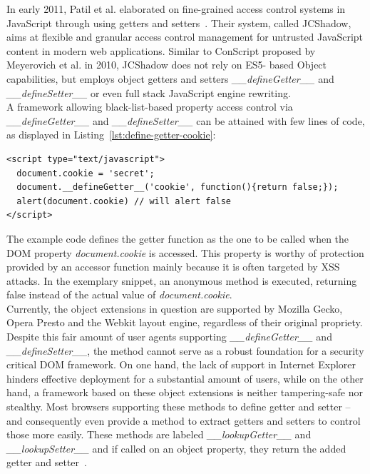       In early 2011, Patil et al. elaborated on fine-grained access control systems in JavaScript through using getters and setters~\cite{patil2011towards}. Their system, called JCShadow, aims at flexible and granular access control management for untrusted JavaScript content in modern web applications. Similar to ConScript proposed by Meyerovich et al. in 2010, JCShadow does not rely on ES5- based Object capabilities, but employs object getters and setters \textit{\_\_defineGetter\_\_} and \textit{\_\_defineSetter\_\_} or even full stack JavaScript engine rewriting. \\

      A framework allowing black-list-based property access control via \textit{\_\_defineGetter\_\_} and \textit{\_\_defineSetter\_\_} can be attained with few lines of code, as displayed in Listing~\ref{lst:define-getter-cookie}:

\begin{lstlisting}[captionpos=b,label=lst:define-getter-cookie,caption=Example defining a new getter for document.cookie]
<script type="text/javascript">
  document.cookie = 'secret';
  document.__defineGetter__('cookie', function(){return false;});
  alert(document.cookie) // will alert false
</script>
\end{lstlisting}  

      The example code defines the getter function as the one to be called when the DOM property \textit{document.cookie} is accessed. This property is worthy of protection provided by an accessor function mainly because it is often targeted by XSS attacks. In the exemplary snippet, an anonymous method is executed, returning false instead of the actual value of \textit{document.cookie}. \\

      Currently, the object extensions in question are supported by Mozilla Gecko, Opera Presto and the Webkit layout engine, regardless of their original propriety. Despite this fair amount of user agents supporting \textit{\_\_defineGetter\_\_} and \textit{\_\_defineSetter\_\_}, the method cannot serve as a robust foundation for a security critical DOM framework. On one hand, the lack of support in Internet Explorer hinders effective deployment for a substantial amount of users, while on the other hand, a framework based on these object extensions is neither tampering-safe nor stealthy. Most browsers supporting these methods to define getter and setter -- and consequently even provide a method to extract getters and setters to control those more easily. These methods are labeled \textit{\_\_lookupGetter\_\_} and \textit{\_\_lookupSetter\_\_} and if called on an object property, they return the added getter and setter~\cite{zbarsky___lookupgetter___2011}. \\

